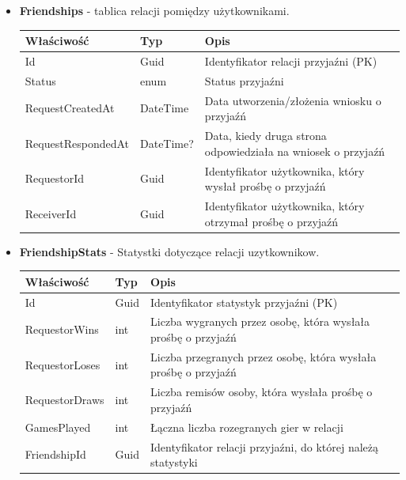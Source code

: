 \documentclass[12pt,a4paper]{article}
\begin{document}
\begin{itemize}
    \item \textbf{Friendships} - tablica relacji pomiędzy użytkownikami.
    \begin{longtable}{|m{4cm}|m{2cm}|m{8cm}|}
        \hline
        \textbf{Właściwość} & \textbf{Typ} & \textbf{Opis} \\ \hline
        \endhead
        \hline
        Id & Guid & Identyfikator relacji przyjaźni (PK) \\ \hline
        Status & enum & Status przyjaźni  \\ \hline
        RequestCreatedAt & DateTime & Data utworzenia/złożenia wniosku o przyjaźń \\ \hline
        RequestRespondedAt & DateTime? & Data, kiedy druga strona odpowiedziała na wniosek o przyjaźń \\ \hline
        RequestorId & Guid & Identyfikator użytkownika, który wysłał prośbę o przyjaźń \\ \hline
        ReceiverId & Guid & Identyfikator użytkownika, który otrzymał prośbę o przyjaźń \\ \hline
    \end{longtable}
        
  
    \item \textbf{FriendshipStats} - Statystki dotyczące relacji uzytkownikow.
    \begin{longtable}{|m{4cm}|m{2cm}|m{8cm}|}
        \hline
        \textbf{Właściwość} & \textbf{Typ} & \textbf{Opis} \\ \hline
        \endhead
        \hline
        Id & Guid & Identyfikator statystyk przyjaźni (PK) \\ \hline
        RequestorWins & int & Liczba wygranych przez osobę, która wysłała prośbę o przyjaźń \\ \hline
        RequestorLoses & int & Liczba przegranych przez osobę, która wysłała prośbę o przyjaźń \\ \hline
        RequestorDraws & int & Liczba remisów osoby, która wysłała prośbę o przyjaźń \\ \hline
        GamesPlayed & int & Łączna liczba rozegranych gier w relacji \\ \hline
        FriendshipId & Guid & Identyfikator relacji przyjaźni, do której należą statystyki \\ \hline
    \end{longtable}
        

\end{itemize}
\end{document}
